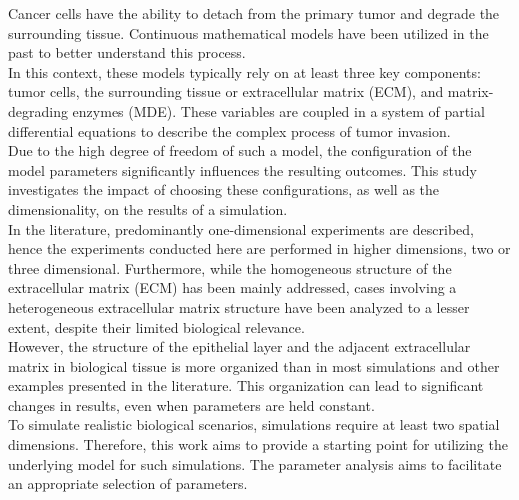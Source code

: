 Cancer cells have the ability to detach from the primary tumor and degrade the surrounding tissue. Continuous mathematical models have been utilized in the past to better understand this process.\\
In this context, these models typically rely on at least three key components: tumor cells, the surrounding tissue or extracellular matrix (ECM), and matrix-degrading enzymes (MDE). These variables are coupled in a system of partial differential equations to describe the complex process of tumor invasion.\\
Due to the high degree of freedom of such a model, the configuration of the model parameters significantly influences the resulting outcomes. This study investigates the impact of choosing these configurations, as well as the dimensionality, on the results of a simulation.\\
In the literature, predominantly one-dimensional experiments are described, hence the experiments conducted here are performed in higher dimensions, two or three dimensional. Furthermore, while the homogeneous structure of the extracellular matrix (ECM) has been mainly addressed, cases involving a heterogeneous extracellular matrix structure have been analyzed to a lesser extent, despite their limited biological relevance.\\
However, the structure of the epithelial layer and the adjacent extracellular matrix in biological tissue is more organized than in most simulations and other examples presented in the literature. This organization can lead to significant changes in results, even when parameters are held constant.\\
To simulate realistic biological scenarios, simulations require at least two spatial dimensions. Therefore, this work aims to provide a starting point for utilizing the underlying model for such simulations. The parameter analysis aims to facilitate an appropriate selection of parameters.

